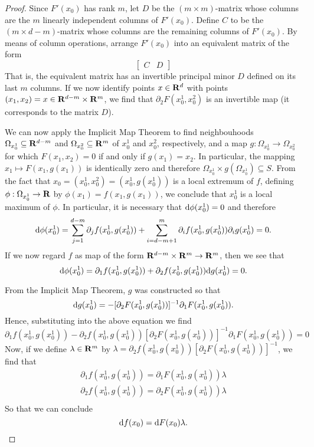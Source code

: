 \begin{proof}
Since \(F'(x_0)\) has rank \(m\), let \(D\) be the \((m \times m)\)-matrix whose
columns are the \(m\) linearly independent columns of \(F'(x_0)\). Define
\(C\) to be the \((m \times d - m)\)-matrix whose columns are the remaining columns
of \(F'(x_0)\). By means of column operations, arrange \(F'(x_0)\) into an
equivalent matrix of the form
\[
  \begin{bmatrix}
    C & D
  \end{bmatrix}
\]
That is, the equivalent matrix has an invertible principal minor \(D\) defined
on its last \(m\) columns. If we now identify points \(x \in \mathbf{R}^d\) with points
\((x_1, x_2) = x \in \mathbf{R}^{d-m} \times \mathbf{R}^m\), we find that \(\partial_2 F(x_0^1, x_0^2)\) is an
invertible map (it corresponds to the matrix \(D\)).

We can now apply the Implicit Map Theorem to find neighbouhoods \(\Omega_{x_{0}^1}
\subseteq \mathbf{R}^{d-m}\) and \(\Omega_{x_0^2} \subseteq \mathbf{R}^m\) of \(x_0^1\) and \(x_0^2\), respectively,
and a map \(g: \Omega_{x_0^1} \to \Omega_{x_0^2}\) for which \(F(x_{1}, x_2) = 0\) if and
only if \(g(x_1) = x_2\). In particular, the mapping \(x_1 \mapsto F(x_1, g(x_1))\)
is identically zero and therefore \(\Omega_{x_0^1} \times g(\Omega_{x_0^1}) \subseteq S\). From the
fact that \(x_0 = (x_0^1, x_0^2) = (x_0^1, g(x_0^1))\) is a local extremum of
\(f\), defining \(\phi: \Omega_{x_0^{1}} \to \mathbf{R}\) by \(\phi(x_1) = f(x_1, g(x_1))\), we
conclude that \(x_0^1\) is a local maximum of \(\phi\). In particular, it is
necessary that \(\mathrm{d} \phi(x_0^1) = 0\) and therefore
\[
  \mathrm{d} \phi(x_0^{1}) = \sum_{j=1}^{d-m} \partial_j f(x_0^1, g(x_0^1)) + \sum_{i = d - m +
    1}^{m} \partial_i f(x_0^1, g(x_0^1)) \partial_i g(x_0^1) = 0.
\]
If we now regard \(f\) as map of the form \(\mathbf{R}^{d-m} \times \mathbf{R}^m \to \mathbf{R}^m\), then we
see that
\[
  \mathrm{d} \phi(x_0^1) = \partial_1 f(x_0^1, g(x_0^1)) + \partial_{2} f(x_0^1, g(x_0^1)) \mathrm{d}
  g(x_0^1) = 0.
\]

From the Implicit Map Theorem, \(g\) was constructed so that
\[
  \mathrm{d} g(x_0^1) = - [\partial_2F(x_0^1, g(x_0^1))]^{-1} \partial_1 F(x_0^1, g(x_{0}^1)).
\]
Hence, substituting into the above equation we find
\[
  \partial_1 f(x_0^1, g(x_0^1)) - \partial_2 f(x_0^1, g(x_0^1)) [\partial_2 F(x_0^1,
  g(x_0^1))]^{-1} \partial_1 F(x_0^1, g(x_0^1)) = 0
\]
Now, if we define \(\lambda \in \mathbf{R}^m\) by \(\lambda = \partial_2f(x_0^{1}, g(x_{0}^{1})) [\partial_2
F(x_{0}^1, g(x_0^1))]^{-1}\), we find that
\begin{gather*}
  \partial_1 f(x_0^{1}, g(x_0^1)) = \partial_1 F(x_0^1, g(x_0^1)) \lambda \\
  \partial_2 f(x_0^{1}, g(x_0^1)) = \partial_2 F(x_0^1, g(x_0^1)) \lambda \\
\end{gather*}
So that we can conclude
\[
  \mathrm{d} f(x_0) = \mathrm{d} F(x_0) \lambda.
\]
\end{proof}

